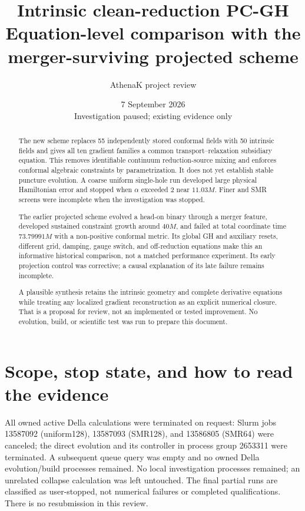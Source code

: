 \documentclass[11pt,letterpaper]{article}
\title{Intrinsic clean-reduction PC-GH\\[3pt]\large Equation-level comparison with the merger-surviving projected scheme}
\author{AthenaK project review}
\date{7 September 2026\\\small Investigation paused; existing evidence only}
\begin{document}
\maketitle
\begin{abstract}
The new scheme replaces 55 independently stored conformal fields with 50 intrinsic fields and gives all ten gradient families a common transport--relaxation subsidiary equation. This removes identifiable continuum reduction-source mixing and enforces conformal algebraic constraints by parametrization. It does not yet establish stable puncture evolution. A coarse uniform single-hole run developed large physical Hamiltonian error and stopped when $\alpha$ exceeded 2 near $11.03M$. Finer and SMR screens were incomplete when the investigation was stopped.

The earlier projected scheme evolved a head-on binary through a merger feature, developed sustained constraint growth around $40M$, and failed at total coordinate time $73.79991M$ with a non-positive conformal metric. Its global GH and auxiliary resets, different grid, damping, gauge switch, and off-reduction equations make this an informative historical comparison, not a matched performance experiment. Its early projection control was corrective; a causal explanation of its late failure remains incomplete.

A plausible synthesis retains the intrinsic geometry and complete derivative equations while treating any localized gradient reconstruction as an explicit numerical closure. That is a proposal for review, not an implemented or tested improvement. No evolution, build, or scientific test was run to prepare this document.
\end{abstract}
\tableofcontents
\clearpage

\section{Scope, stop state, and how to read the evidence}
All owned active Della calculations were terminated on request: Slurm jobs 13587092 (uniform128), 13587093 (SMR128), and 13586805 (SMR64) were canceled; the direct evolution and its controller in process group 2653311 were terminated. A subsequent queue query was empty and no owned Della evolution/build processes remained. No local investigation processes remained; an unrelated collapse calculation was left untouched. The final partial runs are classified as user-stopped, not numerical failures or completed qualifications. There is no resubmission in this review.
\end{document}
